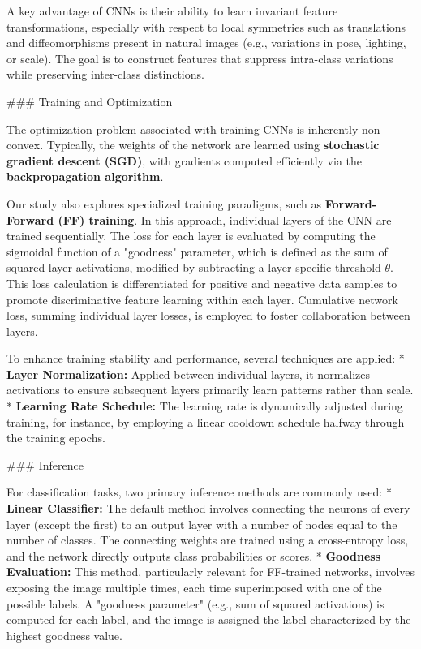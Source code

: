\documentclass{article}
\begin{document}
A key advantage of CNNs is their ability to learn invariant feature transformations, especially with respect to local symmetries such as translations and diffeomorphisms present in natural images (e.g., variations in pose, lighting, or scale). The goal is to construct features that suppress intra-class variations while preserving inter-class distinctions.

\#\#\# Training and Optimization

The optimization problem associated with training CNNs is inherently non-convex. Typically, the weights of the network are learned using \textbf{stochastic gradient descent (SGD)}, with gradients computed efficiently via the \textbf{backpropagation algorithm}.

Our study also explores specialized training paradigms, such as \textbf{Forward-Forward (FF) training}. In this approach, individual layers of the CNN are trained sequentially. The loss for each layer is evaluated by computing the sigmoidal function of a "goodness" parameter, which is defined as the sum of squared layer activations, modified by subtracting a layer-specific threshold $\theta$. This loss calculation is differentiated for positive and negative data samples to promote discriminative feature learning within each layer. Cumulative network loss, summing individual layer losses, is employed to foster collaboration between layers.

To enhance training stability and performance, several techniques are applied:
*   \textbf{Layer Normalization:} Applied between individual layers, it normalizes activations to ensure subsequent layers primarily learn patterns rather than scale.
*   \textbf{Learning Rate Schedule:} The learning rate is dynamically adjusted during training, for instance, by employing a linear cooldown schedule halfway through the training epochs.

\#\#\# Inference

For classification tasks, two primary inference methods are commonly used:
*   \textbf{Linear Classifier:} The default method involves connecting the neurons of every layer (except the first) to an output layer with a number of nodes equal to the number of classes. The connecting weights are trained using a cross-entropy loss, and the network directly outputs class probabilities or scores.
*   \textbf{Goodness Evaluation:} This method, particularly relevant for FF-trained networks, involves exposing the image multiple times, each time superimposed with one of the possible labels. A "goodness parameter" (e.g., sum of squared activations) is computed for each label, and the image is assigned the label characterized by the highest goodness value.
\end{document}
